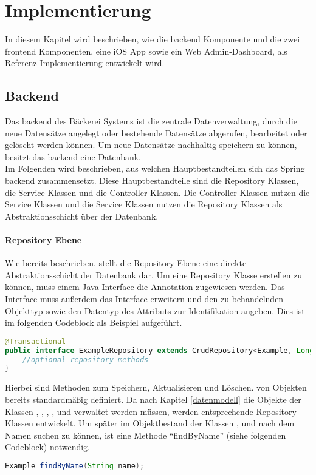 \chapter{Implementierung}
In diesem Kapitel wird beschrieben, wie die \gls{backend} Komponente und die zwei \gls{frontend} Komponenten, eine iOS App sowie ein Web Admin-Dashboard, als Referenz Implementierung entwickelt wird.

\section{Backend} \label{backend}
Das \gls{backend} des Bäckerei Systems ist die zentrale Datenverwaltung, durch die neue Datensätze angelegt oder bestehende Datensätze abgerufen, bearbeitet oder gelöscht werden können. Um neue Datensätze nachhaltig speichern zu können, besitzt das \gls{backend} eine Datenbank.
\\
Im Folgenden wird beschrieben, aus welchen Hauptbestandteilen sich das Spring \gls{backend} zusammensetzt.
Diese Hauptbestandteile sind die Repository Klassen, die Service Klassen und die Controller Klassen.
Die Controller Klassen nutzen die Service Klassen und die Service Klassen nutzen die Repository Klassen als Abstraktionsschicht über der Datenbank.

\clearpage

\subsubsection{Repository Ebene}
Wie bereits beschrieben, stellt die Repository Ebene eine direkte Abstraktionsschicht der Datenbank dar.
Um eine Repository Klasse erstellen zu können, muss einem Java Interface die Annotation  zugewiesen werden. Das Interface muss außerdem das Interface  erweitern und den zu behandelnden Objekttyp sowie den Datentyp des Attributs zur Identifikation angeben. Dies ist im folgenden Codeblock als Beispiel aufgeführt.
\begin{lstlisting}[language=Java]
@Transactional
public interface ExampleRepository extends CrudRepository<Example, Long> {
	//optional repository methods
}
\end{lstlisting}

Hierbei sind Methoden zum Speichern, Aktualisieren und Löschen. von Objekten bereits standardmäßig definiert.
Da nach Kapitel \ref{datenmodell} die Objekte der Klassen , , , ,  und  verwaltet werden müssen, werden entsprechende Repository Klassen entwickelt.
Um später im Objektbestand der Klassen ,  und  nach dem Namen suchen zu können, ist eine Methode \enquote{findByName} (siehe folgenden Codeblock) notwendig.
\begin{lstlisting}[language=Java]
Example findByName(String name);
\end{lstlisting}

